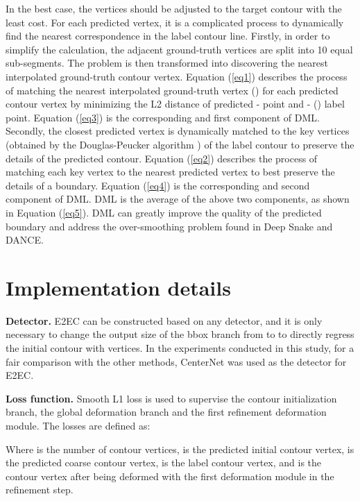 \documentclass[10pt,twocolumn,letterpaper]{article}
\begin{document}
In the best case, the vertices should be adjusted to the target contour with the least cost. For each predicted vertex, it is a complicated process to dynamically find the nearest correspondence in the label contour line. Firstly, in order to simplify the calculation, the adjacent ground-truth vertices are split into 10 equal sub-segments. The problem is then transformed into discovering the nearest interpolated ground-truth contour vertex. Equation (\ref{eq1}) describes the process of matching the nearest interpolated ground-truth vertex () for each predicted contour vertex by minimizing the L2 distance of predicted - point and - () label point. Equation (\ref{eq3}) is the corresponding and first component of DML. Secondly, the closest predicted vertex is dynamically matched to the key vertices (obtained by the Douglas-Peucker algorithm \cite{douglas}) of the label contour to preserve the details of the predicted contour. Equation (\ref{eq2}) describes the process of matching each key vertex to the nearest predicted vertex to best preserve the details of a boundary. Equation (\ref{eq4}) is the corresponding and second component of DML. DML is the average of the above two components, as shown in Equation (\ref{eq5}). DML can greatly improve the quality of the predicted boundary and address the over-smoothing problem found in Deep Snake and DANCE.\vspace{-2mm}
\begin{small}
\vspace{-3mm}
\vspace{-1mm}
\vspace{-3mm}


\end{small}\vspace{-3mm}
\section{Implementation details}
\textbf{Detector.} E2EC can be constructed based on any detector, and it is only necessary to change the output size of the bbox branch from  to  to directly regress the initial contour with  vertices. In the experiments conducted in this study, for a fair comparison with the other methods, CenterNet \cite{centernet} was used as the detector for E2EC.

\textbf{Loss function.} Smooth L1 loss is used to supervise the contour initialization branch, the global deformation branch and the first refinement deformation module. The losses are defined as:\vspace{-3mm}
\begin{small}
\vspace{-3mm}


\end{small}Where  is the number of contour vertices,  is the predicted initial contour vertex,  is the predicted coarse contour vertex,  is the label contour vertex, and  is the contour vertex after being deformed with the first deformation module in the refinement step.
\end{document}

